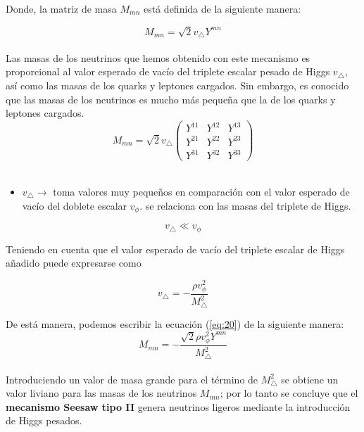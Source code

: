 \documentclass[12pt]{article}
\begin{document}
Donde, la matriz de masa \(M_{mn} \) está definida de la siguiente manera: 

\[M_{mn} = \sqrt{2}v_\triangle Y^{mn}\] \\

Las masas de los neutrinos que hemos obtenido con este mecanismo
es proporcional al valor esperado de vacío del triplete escalar pesado de Higgs  $v_\triangle  $, así como
las masas de los quarks y leptones cargados. Sin embargo, es conocido
que las masas de los neutrinos es mucho más pequeña que la de los
quarks y leptones cargados. \\

\begin{equation}
    M_{mn} = \sqrt{2}v_\triangle \begin{pmatrix}    Y^{11} &  Y^{12} & Y^{13} \\
         Y^{21} &  Y^{22} & Y^{23}  \\
         Y^{31} &  Y^{32} & Y^{33}  \end{pmatrix}
       \label{eq:20}  
\end{equation} \\

\begin{itemize}
    \item \(v_\triangle \rightarrow  \) toma valores muy pequeños
en comparación con el valor esperado de vacío del doblete escalar $v_\phi$. se relaciona con las masas del triplete de Higgs.  
\end{itemize}
\[v_\triangle \ll v_\phi \]
  
Teniendo en cuenta que el valor esperado de vacío del triplete escalar de Higgs añadido puede expresarse como

\begin{equation}
    \label{eq:valoeradodevacío}
     v_\triangle = - \frac{\rho v^{2}_\phi}{M^{2}_\triangle}
\end{equation}

De está manera, podemos escribir la ecuación (\ref{eq:20}) de la siguiente manera: \\

\begin{equation}
    M_{mn}= -\frac{\sqrt{2}\rho v^{2}_\phi Y^{mn}}{M^{2}_\triangle} 
\end{equation} \\

Introduciendo un valor de masa grande para el término de \( M^{2}_\triangle \) se obtiene un valor liviano para las masas de los neutrinos \( M_{mn} \); por lo tanto se concluye que el \textbf{mecanismo Seesaw tipo II} genera neutrinos ligeros mediante la introducción de Higgs pesados. \\
\end{document}
